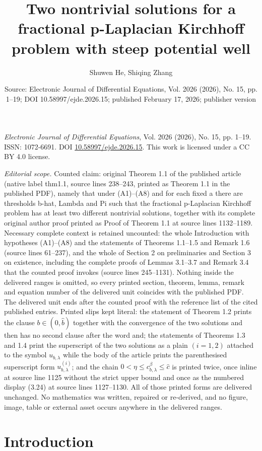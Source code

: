 \documentclass[10pt,a4paper]{amsart}
\title[Two nontrivial solutions for a fractional p-Laplacian Kirchhoff]{Two nontrivial solutions for a fractional p-Laplacian Kirchhoff problem with steep potential well}
\author{Shuwen He, Shiqing Zhang}
\date{Source: Electronic Journal of Differential Equations, Vol. 2026 (2026), No. 15, pp. 1--19; DOI 10.58997/ejde.2026.15; published February 17, 2026; publisher version}
\numberwithin{equation}{section}
\begin{document}
\maketitle
\noindent\emph{Electronic Journal of Differential Equations}, Vol. 2026 (2026), No. 15, pp. 1--19.\newline
ISSN: 1072-6691. DOI \href{https://doi.org/10.58997/ejde.2026.15}{10.58997/ejde.2026.15}. This work is licensed under a CC BY 4.0 license.\par\smallskip
\noindent\textit{Editorial scope.} Counted claim: original Theorem 1.1 of the published article (native label thm1.1, source lines 238--243, printed as Theorem 1.1 in the published PDF), namely that under (A1)--(A8) and for each fixed a there are thresholds b-hat, Lambda and Pi such that the fractional p-Laplacian Kirchhoff problem has at least two different nontrivial solutions, together with its complete original author proof printed as Proof of Theorem 1.1 at source lines 1132--1189. Necessary complete context is retained uncounted: the whole Introduction with hypotheses (A1)--(A8) and the statements of Theorems 1.1--1.5 and Remark 1.6 (source lines 61--237), and the whole of Section 2 on preliminaries and Section 3 on existence, including the complete proofs of Lemmas 3.1--3.7 and Remark 3.4 that the counted proof invokes (source lines 245--1131). Nothing inside the delivered ranges is omitted, so every printed section, theorem, lemma, remark and equation number of the delivered unit coincides with the published PDF. The delivered unit ends after the counted proof with the reference list of the cited published entries. Printed slips kept literal: the statement of Theorem 1.2 prints the clause $b\in(0,\widehat{b})$ together with the convergence of the two solutions and then has no second clause after the word and; the statements of Theorems 1.3 and 1.4 print the superscript of the two solutions as a plain $(i=1,2)$ attached to the symbol $u_{b,\lambda}$ while the body of the article prints the parenthesised superscript form $u^{(i)}_{b,\lambda}$; and the chain $0<\eta\leq c_{b,\lambda}^{\beta}\leq\widehat{c}$ is printed twice, once inline at source line 1125 without the strict upper bound and once as the numbered display (3.24) at source lines 1127--1130. All of those printed forms are delivered unchanged. No mathematics was written, repaired or re-derived, and no figure, image, table or external asset occurs anywhere in the delivered ranges.
\section{Introduction}
\end{document}
